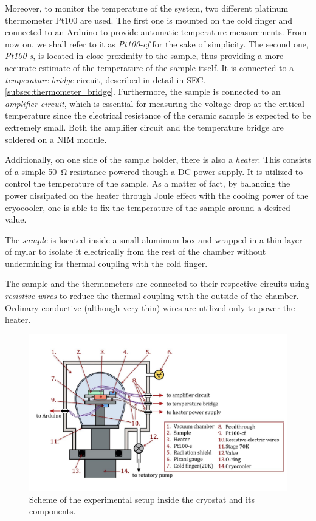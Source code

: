 \documentclass[rmp,10pt,onecolumn,fleqn,notitlepage]{revtex4-1}
\begin{document}
Moreover, to monitor the temperature of the system, two different platinum thermometer Pt100 are used. The first one is mounted on the cold finger and connected to an Arduino to provide automatic temperature measurements. 
From now on, we shall refer to it as \textit{Pt100-cf} for the sake of simplicity. The second one, \textit{Pt100-s}, is located in close proximity to the sample, thus providing a more accurate estimate of the temperature of the sample itself. It is connected to a \textit{temperature bridge} circuit, described in detail in SEC. \ref{subsec:thermometer_bridge}.
Furthermore, the sample is connected to an \textit{amplifier circuit}, which is essential for measuring the voltage drop at the critical temperature since the electrical resistance of the ceramic sample is expected to be extremely small.
Both the amplifier circuit and the temperature bridge are soldered on a NIM module.

Additionally, on one side of the sample holder, there is also a \textit{heater}. This consists of a simple \SI{50}{\ohm} resistance powered though a DC power supply. It is utilized to control the temperature of the sample. As a matter of fact, by balancing the power dissipated on the heater through Joule effect with the cooling power of the cryocooler, one is able to fix the temperature of the sample around a desired value.

The \textit{sample} is located inside a small aluminum box and wrapped in a thin layer of mylar to isolate it electrically from the rest of the chamber without undermining its thermal coupling with the cold finger.

The sample and the thermometers are connected to their respective circuits using \textit{resistive wires} to reduce the thermal coupling with the outside of the chamber. Ordinary conductive (although very thin) wires are utilized only to power the heater. 

\begin{figure}[h!]
    \centering
    \includegraphics[width=\textwidth]{image/schemes/Setupscheme.pdf}
    \caption{Scheme of the experimental setup inside the cryostat and its components.}
    \label{fig:setup}
\end{figure}
\end{document}
